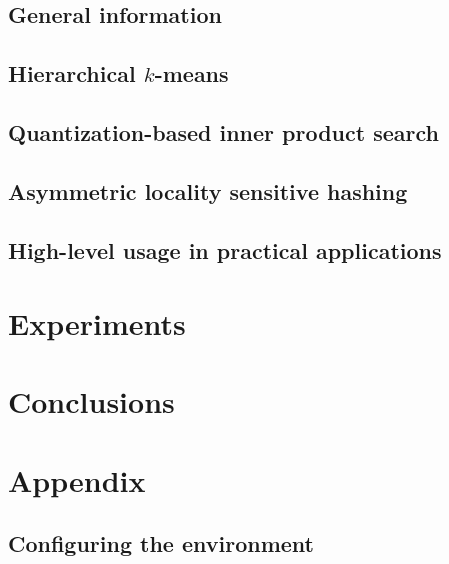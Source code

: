\documentclass[english,bachelor,a4paper,twoside,11pt]{ppfcmthesis}
\begin{document}
	\section{General information}
	
	\section{Hierarchical $k$-means}
	
	\section{Quantization-based inner product search}
	
	\section{Asymmetric locality sensitive hashing}
	
	\section{High-level usage in practical applications}
	
\chapter{Experiments}
	
	
\chapter{Conclusions}
	


\newpage
\chapter{Appendix}
\section{Configuring the environment}
	

\ppcolophon
\end{document}
